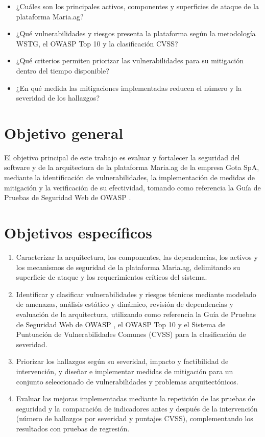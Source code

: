 \documentclass[12pt,letterpaper]{report}
\begin{document}
\begin{itemize}[leftmargin=1.25cm]
    \item ¿Cuáles son los principales activos, componentes y superficies de ataque de la plataforma Maria.ag?
    \item ¿Qué vulnerabilidades y riesgos presenta la plataforma según la metodología WSTG, el OWASP Top 10 y la clasificación CVSS?
    \item ¿Qué criterios permiten priorizar las vulnerabilidades para su mitigación dentro del tiempo disponible?
    \item ¿En qué medida las mitigaciones implementadas reducen el número y la severidad de los hallazgos?
\end{itemize}

\newpage

\chapter*{Objetivo general}

El objetivo principal de este trabajo es evaluar y fortalecer la seguridad del software y de la arquitectura de la plataforma Maria.ag de la empresa Gota SpA, mediante la identificación de vulnerabilidades, la implementación de medidas de mitigación y la verificación de su efectividad, tomando como referencia la Guía de Pruebas de Seguridad Web de OWASP \autocite{owasp2024wstg}.
\newpage

\chapter*{Objetivos específicos}

\begin{enumerate}[leftmargin=1.25cm]
    \item Caracterizar la arquitectura, los componentes, las dependencias, los activos y los mecanismos de seguridad de la plataforma Maria.ag, delimitando su superficie de ataque y los requerimientos críticos del sistema.
    \item Identificar y clasificar vulnerabilidades y riesgos técnicos mediante modelado de amenazas, análisis estático y dinámico, revisión de dependencias y evaluación de la arquitectura, utilizando como referencia la Guía de Pruebas de Seguridad Web de OWASP \autocite{owasp2024wstg}, el OWASP Top 10 \autocite{owasp2025top10} y el Sistema de Puntuación de Vulnerabilidades Comunes (CVSS) \autocite{first2023cvss} para la clasificación de severidad.
    \item Priorizar los hallazgos según su severidad, impacto y factibilidad de intervención, y diseñar e implementar medidas de mitigación para un conjunto seleccionado de vulnerabilidades y problemas arquitectónicos.
    \item Evaluar las mejoras implementadas mediante la repetición de las pruebas de seguridad y la comparación de indicadores antes y después de la intervención (número de hallazgos por severidad y puntajes CVSS), complementando los resultados con pruebas de regresión.
\end{enumerate}
\newpage
\end{document}
